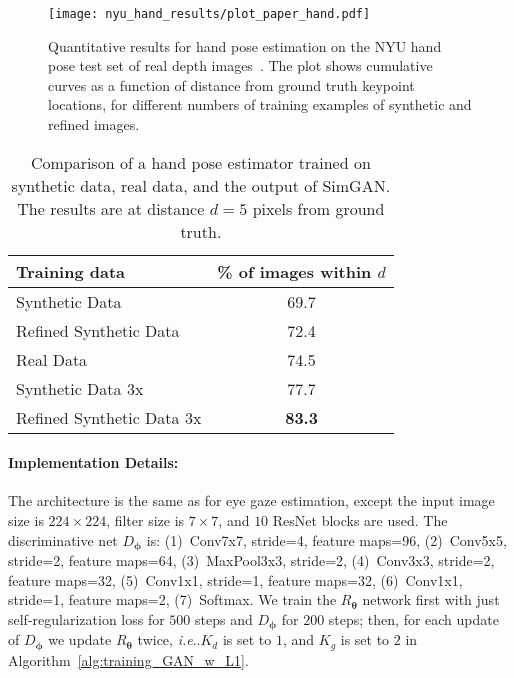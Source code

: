 \documentclass[10pt,twocolumn,letterpaper]{article}
\makeatletter
\DeclareRobustCommand\onedot{\futurelet\@let@token\@onedot}
\def\@onedot{\ifx\@let@token.\else.\null\fi\xspace}
\def\ie{\emph{i.e}\onedot} \def\Ie{\emph{I.e}\onedot}
\makeatother
\begin{document}
\begin{figure}
\centering
\vspace{-0.2cm}
\texttt{[image: nyu\_hand\_results/plot\_paper\_hand.pdf]}
\vspace{-0.6cm}
\caption{Quantitative results for hand pose estimation on the NYU hand pose test set of real depth images~\cite{tompson14NYU}.
The plot shows cumulative curves as a function of distance from ground truth keypoint locations, for different numbers of training examples of synthetic and refined images.
}
\label{fig:handpose_result_quantitative}
\end{figure}




\begin{table}
\centering
\begin{tabular}{|l|c|} \hline
Training data  & \% of images within $d$  \\ \hline 
Synthetic Data & 69.7 \\
Refined Synthetic Data & 72.4 \\
Real Data & 74.5 \\
Synthetic Data 3x & 77.7 \\
Refined Synthetic Data 3x & {\bf 83.3} \\
\hline
\end{tabular}
\caption{Comparison of a hand pose estimator trained on synthetic data, real data, and the output of SimGAN.
The results are at distance $d=5$ pixels from ground truth.
}
\label{tab:handpose_result_table}
\end{table}

\vspace{-0.1in}
\paragraph{Implementation Details:}
The architecture is the same as for eye gaze estimation, except the input image size is $224 \times 224$, filter size is $7 \times 7$, and $10$ ResNet blocks are used.
The discriminative net $D_{\boldsymbol \phi}$ is:
(1)~Conv7x7, stride=4, feature maps=96, 
(2)~Conv5x5, stride=2, feature maps=64, 
(3)~MaxPool3x3, stride=2, 
(4)~Conv3x3, stride=2, feature maps=32,  
(5)~Conv1x1, stride=1, feature maps=32,  
(6)~Conv1x1, stride=1, feature maps=2,  
(7)~Softmax. 
We train the $R_{\boldsymbol \theta}$ network first with just  self-regularization loss for $500$ steps and $D_{\boldsymbol \phi}$ for $200$ steps; then, for each update of $D_{\boldsymbol \phi}$ we update $R_{\boldsymbol \theta}$ twice, \ie $K_d$ is set to $1$, and $K_g$ is set to $2$ in Algorithm~\ref{alg:training_GAN_w_L1}.
\end{document}
